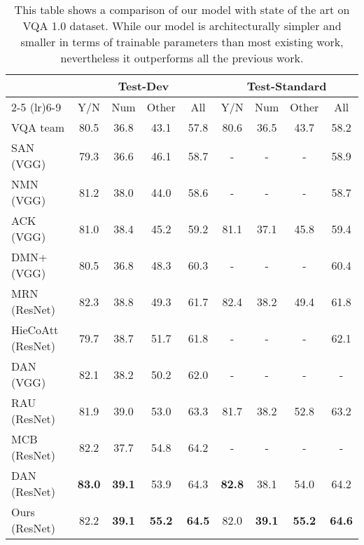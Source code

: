 \documentclass[10pt,twocolumn,letterpaper]{article}
\begin{document}
\begin{table*}
	\footnotesize
	\centering
	\tabcolsep=0.6cm
	\begin{tabular}{l c c c c c c c c}
		\toprule
		\multirow{4}{*}{\raisebox{-\heavyrulewidth}{Method}} & 
		
		\multicolumn{4}{c}{Test-Dev} & 
		\multicolumn{4}{c}{Test-Standard} \\
		\cmidrule(lr){2-5}
		\cmidrule(lr){6-9}
		& Y/N & Num & Other & All  & Y/N & Num & Other  & All \\ 
		\midrule[1pt]
		VQA team \cite{Antol2015VQAVQ} & 80.5 & 36.8 & 43.1 & 57.8 & 80.6 & 36.5 & 43.7 & 58.2 \\
		SAN (VGG) \cite{Yang2016StackedAN} & 79.3 & 36.6 & 46.1 & 58.7 & - & - & - & 58.9 \\
		NMN (VGG) \cite{Andreas2016NeuralMN} & 81.2 & 38.0 & 44.0 & 58.6 & - & - & - & 58.7 \\
		ACK (VGG) \cite{Wu2016AskMA} & 81.0 & 38.4 & 45.2 & 59.2 & 81.1 & 37.1 & 45.8 & 59.4 \\
		DMN+ (VGG) \cite{Xiong2016DynamicMN} & 80.5 & 36.8 & 48.3 & 60.3 & - & - & - & 60.4 \\
		MRN (ResNet) \cite{Kim2016MultimodalRL} & 82.3 & 38.8 & 49.3 & 61.7 & 82.4 & 38.2 & 49.4 & 61.8 \\
		HieCoAtt (ResNet) \cite{Lu2016HierarchicalQC} & 79.7 & 38.7 & 51.7 & 61.8 & - & - & - & 62.1 \\
		DAN (VGG) \cite{Nam2016DualAN} &  82.1 & 38.2 & 50.2 & 62.0 & -  &  - &  - & - \\
		RAU (ResNet) \cite{Noh2016TrainingRA} & 81.9 & 39.0 & 53.0 & 63.3 & 81.7 & 38.2 & 52.8 & 63.2 \\
		MCB (ResNet) \cite{Fukui2016MultimodalCB} & 82.2 & 37.7 & 54.8 & 64.2 & - & - & - & - \\
		DAN (ResNet) \cite{Nam2016DualAN} & \textbf{83.0} & \textbf{39.1} & 53.9 & 64.3 & \textbf{82.8} & 38.1 & 54.0 & 64.2 \\
		\midrule
		Ours (ResNet) & 82.2 & \textbf{39.1} & \textbf{55.2} & \textbf{64.5} & 82.0 & \textbf{39.1} & \textbf{55.2} & \textbf{64.6} \\
		\bottomrule
	\end{tabular}
	\vspace{.1cm}
	\caption{This table shows a comparison of our model with state of the art on VQA 1.0 dataset. While our model is architecturally simpler and smaller in terms of trainable parameters than most existing work, nevertheless it outperforms all the previous work.} 
	\label{table:comp_vqa1}
\end{table*}
\end{document}

